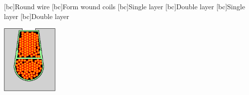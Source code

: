 \begin{psfrags}%
\psfragscanon

[bc]{{\tiny Round wire}}
[bc]{{\tiny Form wound coils}}
[bc]{{\tiny Single layer}}
[bc]{{\tiny Double layer}}
[bc]{{\tiny Single layer}}
[bc]{{\tiny Double layer}}

\includegraphics[width=0.21\textwidth]{figs/f_insulation_b.eps}
\end{psfrags}%